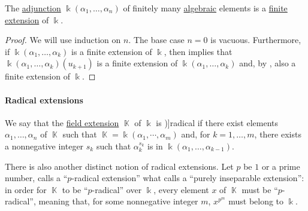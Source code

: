 \begin{proposition}\label{thm:finite_adjunction_finite_extension}
  The \hyperref[def:field_adjunction]{adjunction} \( \Bbbk(\alpha_1, \ldots, \alpha_n) \) of finitely many \hyperref[def:algebraic_element]{algebraic} elements is a \hyperref[def:field_extension_degree]{finite extension} of \( \Bbbk \).
\end{proposition}
\begin{proof}
  We will use induction on \( n \). The base case \( n = 0 \) is vacuous. Furthermore, if \( \Bbbk(\alpha_1, \ldots, \alpha_k) \) is a finite extension of \( \Bbbk \), then  implies that \( \Bbbk(\alpha_1, \ldots, \alpha_k)(u_{k+1}) \) is a finite extension of \( \Bbbk(\alpha_1, \ldots, \alpha_k) \) and, by , also a finite extension of \( \Bbbk \).
\end{proof}

\paragraph{Radical extensions}

\begin{definition}\label{def:radical_extension}
  We say that the \hyperref[def:field/submodel]{field extension} \( \BbbK \) of \( \Bbbk \) is \term[ru=радикальное (рассширение) (\cite[\S D18.3]{Тыртышников2007ЛинейнаяАлгебра})]{radical} if there exist elements \( \alpha_1, \ldots, \alpha_n \) of \( \BbbK \) such that \( \BbbK = \Bbbk(\alpha_1, \cdots, \alpha_m) \) and, for \( k = 1, \ldots, m \), there exists a nonnegative integer \( s_k \) such that \( \alpha_k^{s_k} \) is in \( \Bbbk(\alpha_1, \ldots, \alpha_{k-1}) \).
\end{definition}
\begin{comments}
  \item There is also another distinct notion of radical extensions. Let \( p \) be \( 1 \) or a prime number,  calls a \enquote{\( p \)-radical extension} what  calls a \enquote{purely inseparable extension}: in order for \( \BbbK \) to be \enquote{\( p \)-radical} over \( \Bbbk \), every element \( x \) of \( \BbbK \) must be \enquote{\( p \)-radical}, meaning that, for some nonnegative integer \( m \), \( x^{p^m} \) must belong to \( \Bbbk \).
\end{comments}

